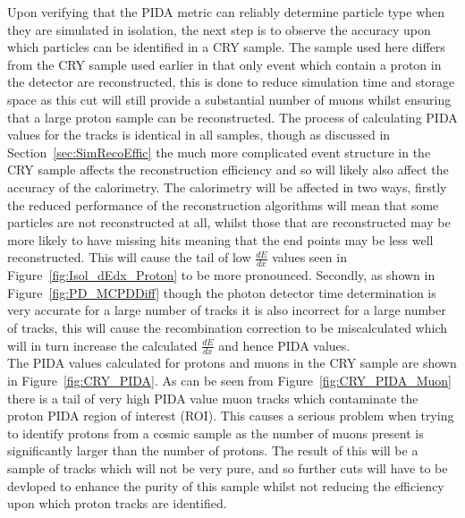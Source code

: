 Upon verifying that the PIDA metric can reliably determine particle type when they are simulated in isolation, the next step is to observe the accuracy upon which particles can be identified in a CRY sample. The sample used here differs from the CRY sample used earlier in that only event which contain a proton in the detector are reconstructed, this is done to reduce simulation time and storage space as this cut will still provide a substantial number of muons whilst ensuring that a large proton sample can be reconstructed. The process of calculating PIDA values for the tracks is identical in all samples, though as discussed in Section~\ref{sec:SimRecoEffic} the much more complicated event structure in the CRY sample affects the reconstruction efficiency and so will likely also affect the accuracy of the calorimetry. The calorimetry will be affected in two ways, firstly the reduced performance of the reconstruction algorithms will mean that some particles are not reconstructed at all, whilst those that are reconstructed may be more likely to have missing hits meaning that the end points may be less well reconstructed. This will cause the tail of low $\frac{dE}{dx}$ values seen in Figure~\ref{fig:Isol_dEdx_Proton} to be more pronounced. Secondly, as shown in Figure~\ref{fig:PD_MCPDDiff} though the photon detector time determination is very accurate for a large number of tracks it is also incorrect for a large number of tracks, this will cause the recombination correction to be miscalculated which will in turn increase the calculated $\frac{dE}{dx}$ and hence PIDA values. \\

The PIDA values calculated for protons and muons in the CRY sample are shown in Figure~\ref{fig:CRY_PIDA}. As can be seen from Figure~\ref{fig:CRY_PIDA_Muon} there is a tail of very high PIDA value muon tracks which contaminate the proton PIDA region of interest (ROI). This causes a serious problem when trying to identify protons from a cosmic sample as the number of muons present is significantly larger than the number of protons. The result of this will be a sample of tracks which will not be very pure, and so further cuts will have to be devloped to enhance the purity of this sample whilst not reducing the efficiency upon which proton tracks are identified. 

